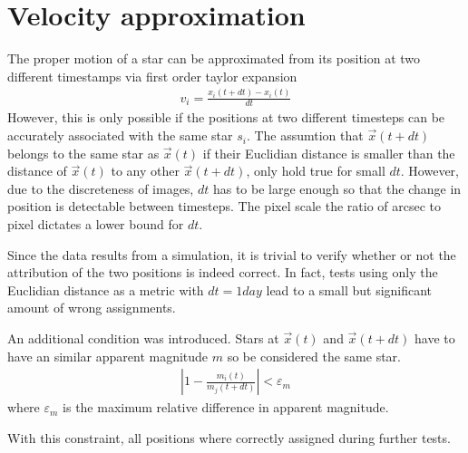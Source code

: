 \documentclass[letterpaper,10pt,english]{sphinxmanual}
\begin{document}
\section{Velocity approximation}
\label{\detokenize{NBodySimulation/Clustering:velocity-approximation}}
\sphinxAtStartPar
The proper motion of a star can be approximated from its position at two different timestamps via first order taylor expansion
\begin{equation*}
\begin{split}v_{i} = \frac{x_{i}\left ( t+dt \right )-x_{i}\left ( t \right )}{dt}\end{split}
\end{equation*}
\sphinxAtStartPar
However, this is only possible if the positions at two different timesteps can be accurately associated with the same star \(s_{i}\).
The assumtion that \(\vec{x}(t+dt)\) belongs to the same star as \(\vec{x}(t)\) if their Euclidian distance is smaller than the distance of \(\vec{x}(t)\) to any other \(\vec{x}(t+dt)\),
only hold true for small \(dt\). However, due to the discreteness of images, \(dt\) has to be large enough so that the change in position is detectable between timesteps.
The pixel scale \sphinxhyphen{} the ratio of arcsec to pixel \sphinxhyphen{} dictates a lower bound for \(dt\).

\sphinxAtStartPar
Since the data results from a simulation, it is trivial to verify whether or not the attribution of the two positions is indeed correct.
In fact, tests using only the Euclidian distance as a metric with \(dt = 1 day\) lead to a small but significant amount of wrong assignments.

\sphinxAtStartPar
An additional condition was introduced. Stars at \(\vec{x}(t)\) and \(\vec{x}(t+dt)\) have to have an similar apparent magnitude \(m\) so be considered the same star.
\begin{equation*}
\begin{split}\left | 1-\frac{m_{i}\left ( t \right )}{m_{j}\left ( t+dt \right )} \right | < \varepsilon_{m}\end{split}
\end{equation*}
\sphinxAtStartPar
where \(\varepsilon_{m}\) is the maximum relative difference in apparent magnitude.

\sphinxAtStartPar
With this constraint, all positions where correctly assigned during further tests.
\end{document}
